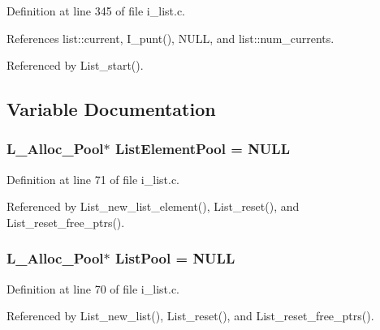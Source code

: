 Definition at line 345 of file i\_\-list.c.

References list::current, I\_\-punt(), NULL, and list::num\_\-currents.

Referenced by List\_\-start().

\subsection{Variable Documentation}
\subsubsection{\setlength{\rightskip}{0pt plus 5cm}\bf{L\_\-Alloc\_\-Pool}$\ast$ \bf{List\-Element\-Pool} = NULL}\label{i__list_8c_311b4ac6de98b268c1838d6d585537dd}




Definition at line 71 of file i\_\-list.c.

Referenced by List\_\-new\_\-list\_\-element(), List\_\-reset(), and List\_\-reset\_\-free\_\-ptrs().
\subsubsection{\setlength{\rightskip}{0pt plus 5cm}\bf{L\_\-Alloc\_\-Pool}$\ast$ \bf{List\-Pool} = NULL}\label{i__list_8c_b3447a3b749835f2478a1c414a53c0d1}




Definition at line 70 of file i\_\-list.c.

Referenced by List\_\-new\_\-list(), List\_\-reset(), and List\_\-reset\_\-free\_\-ptrs().